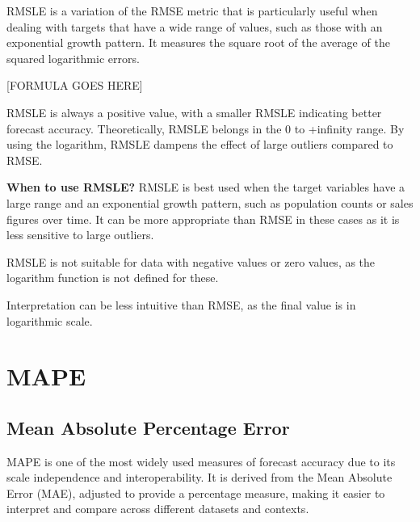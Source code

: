 RMSLE is a variation of the RMSE metric that is particularly useful when dealing with targets that have a wide range of values, such as those with an exponential growth pattern.
It measures the square root of the average of the squared logarithmic errors.

\begin{center}
    [FORMULA GOES HERE]
\end{center}

RMSLE is always a positive value, with a smaller RMSLE indicating better forecast accuracy. Theoretically, RMSLE belongs in the 0 to +infinity range.
By using the logarithm, RMSLE dampens the effect of large outliers compared to RMSE.

\textbf{When to use RMSLE?}
RMSLE is best used when the target variables have a large range and an exponential growth pattern, such as population counts or sales figures over time.
It can be more appropriate than RMSE in these cases as it is less sensitive to large outliers.

{
    \item RMSLE is not suitable for data with negative values or zero values, as the logarithm function is not defined for these.
    \item Interpretation can be less intuitive than RMSE, as the final value is in logarithmic scale.
}

\clearpage
\thispagestyle{regressionstyle}
\section{MAPE}
\subsection{Mean Absolute Percentage Error}

MAPE is one of the most widely used measures of forecast accuracy due to its scale independence and interoperability.
It is derived from the Mean Absolute Error (MAE), adjusted to provide a percentage measure, making it easier to interpret and compare across different datasets and contexts.

